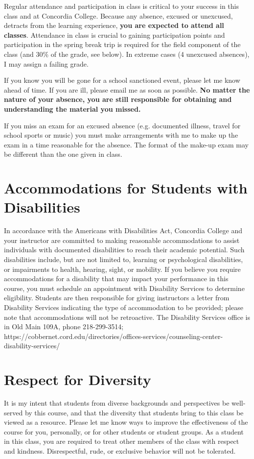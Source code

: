 \documentclass{tufte-handout}
\begin{document}
\begin{fullwidth}
Regular attendance and participation in class is critical to your success in this class and at Concordia College. Because any absence, excused or unexcused, detracts from the learning experience, \textbf{you are expected to attend all classes}. Attendance in class is crucial to gaining participation points and participation in the spring break trip is required for the field component of the class (and 30\% of the grade, see below).  In extreme cases (4 unexcused absences), I may assign a failing grade. 

If you know you will be gone for a school sanctioned event, please let me know ahead of time. If you are ill, please email me as soon as possible. \textbf{No matter the nature of your absence, you are still responsible for obtaining and understanding the material you missed.} 

If you miss an exam for an excused absence (e.g. documented illness, travel for school sports or music) you must make arrangements with me to make up the exam in a time reasonable for the absence. The format of the make-up exam may be different than the one given in class.



\section{Accommodations for Students with Disabilities}

In accordance with the Americans with Disabilities Act, Concordia College and your instructor are committed to making reasonable accommodations to assist individuals with documented disabilities to reach their academic potential. Such disabilities include, but are not limited to, learning or psychological disabilities, or impairments to health, hearing, sight, or mobility. If you believe you require accommodations for a disability that may impact your performance in this course, you must schedule an appointment with Disability Services to determine eligibility. Students are then responsible for giving instructors a letter from Disability Services indicating the type of accommodation to be provided; please note that accommodations will not be retroactive. The Disability Services office is in Old Main 109A, phone 218-299-3514; https://cobbernet.cord.edu/directories/offices-services/counseling-center-disability-services/

\section{Respect for Diversity}

It is my intent that students from diverse backgrounds and perspectives be well-served by this course, and that the diversity that students bring to this class be viewed as a resource. Please let me know ways to improve the effectiveness of the course for you, personally, or for other students or student groups. As a student in this class, you are required to treat other members of the class with respect and kindness. Disrespectful, rude, or exclusive behavior will not be tolerated.

\end{fullwidth}
\end{document}
